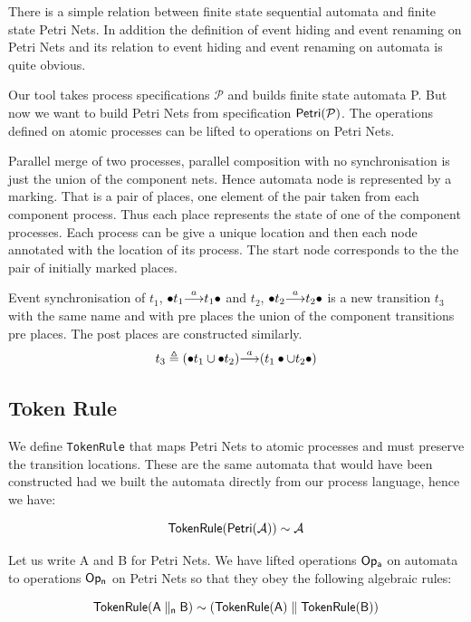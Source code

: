 \documentclass[]{article}
\begin{document}
{There is a simple relation between finite state sequential automata and finite state Petri Nets. In addition the definition of event hiding and event renaming   on Petri Nets and its relation to event hiding and event renaming   on  automata is quite obvious.



Our tool takes process specifications $\mathcal{P}$ and builds finite state automata {\sf P}. But now we want to build Petri Nets from specification ${\sf Petri(\mathcal{P})}$. The operations defined on atomic processes can be lifted to operations on Petri Nets.

Parallel merge of two processes, parallel composition with no synchronisation is just the union of the component nets. Hence automata node is represented by a marking. That is a pair of places, one element of the pair taken from each component process. Thus each place represents the state of one of the component processes. Each process can be give a unique location and then each node annotated with the location of its process.
The start node corresponds to the the pair of initially marked places.

Event synchronisation of $t_1$, ${\bullet t_1}{\stackrel{a}{\longrightarrow}}{t_1\bullet} $ and $t_2$, ${\bullet t_2}{\stackrel{a}{\longrightarrow}}{t_2\bullet} $ is a new transition $t_3$ with the same name and with pre places the union of the component transitions pre places. The post places are constructed similarly.
\[t_3\triangleq {(\bullet t_1\cup \bullet t_2)}{\stackrel{a}{\longrightarrow}}{(t_1\bullet \cup t_2\bullet) } \]




\subsection{Token Rule}


 We define \verb|TokenRule| that maps Petri Nets to atomic processes and must preserve the transition  locations.  These are the same automata that would have been constructed had we built the automata directly from our process language, hence we have:

\[{\sf TokenRule(Petri(\mathcal{A}))\sim  \mathcal{A}}\]

Let us write {\sf A} and {\sf B} for Petri Nets. We have   lifted   operations ${\sf Op_a}$ on automata to   operations ${\sf Op_n}$ on Petri Nets  so that they obey  the following algebraic rules:

\[{\sf TokenRule({\sf A}\parallel_n {\sf B})\sim  (TokenRule({\sf A})\parallel TokenRule({\sf B})) }\]

}
\end{document}
